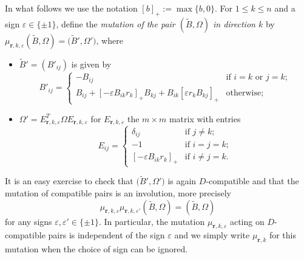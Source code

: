 \documentclass{amsart}
\numberwithin{equation}{section}
\newcommand{\bfr}{{\boldsymbol{r}}}
\renewcommand{\max}{\operatorname{max}}
\begin{document}
In what follows we use the notation $[b]_+:=\max\{b,0\}$.
For $1\le k\le n$ and a sign $\varepsilon\in\{\pm1\}$, define the \emph{mutation of the pair $(\tilde B,\Omega)$ in direction $k$} by $\mu_{\bfr,k,\varepsilon}(\tilde B,\Omega)=\big(\tilde B',\Omega'\big)$, where
\begin{itemize}
  \item $\tilde B'=(B'_{ij})$ is given by
    \[B'_{ij}=\begin{cases}-B_{ij} & \text{if $i=k$ or $j=k$;}\\ B_{ij} + [-\varepsilon B_{ik}r_k]_+ B_{kj} + B_{ik} [\varepsilon r_kB_{kj}]_+ & \text{otherwise;}\end{cases}\]
  \item $\Omega'=E_{\bfr,k,\varepsilon}^T\Omega E_{\bfr,k,\varepsilon}$ for $E_{\bfr,k,\varepsilon}$ the $m\times m$ matrix with entries
    \[E_{ij}=\begin{cases}\delta_{ij} & \text{if $j\ne k$;}\\ -1 & \text{if $i=j=k$;}\\ [-\varepsilon B_{ik}r_k]_+ & \text{if $i\ne j=k$.}\end{cases}\]
\end{itemize}
It is an easy exercise to check that $\big(\tilde B',\Omega'\big)$ is again $D$-compatible and that the mutation of compatible pairs is an involution, more precisely 
\[\mu_{\bfr,k,\varepsilon}\mu_{\bfr,k,\varepsilon'}(\tilde B,\Omega)=(\tilde B,\Omega)\]
for any signs $\varepsilon,\varepsilon'\in\{\pm1\}$.
In particular, the mutation $\mu_{\bfr,k,\varepsilon}$ acting on $D$-compatible pairs is independent of the sign $\varepsilon$ and we simply write $\mu_{\bfr,k}$ for this mutation when the choice of sign can be ignored.
\end{document}
